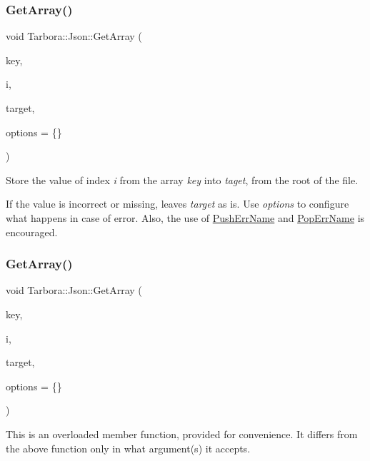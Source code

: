 \subsubsection{\texorpdfstring{Get\+Array()}{GetArray()}\hspace{0.1cm}{\footnotesize\ttfamily [1/12]}}
{\footnotesize\ttfamily void Tarbora\+::\+Json\+::\+Get\+Array (\begin{DoxyParamCaption}\item[{const char $\ast$}]{key,  }\item[{int}]{i,  }\item[{raw\+\_\+json $\ast$}]{target,  }\item[{\hyperlink{structTarbora_1_1JsonOptions}{Json\+Options}}]{options = {\ttfamily \{\}} }\end{DoxyParamCaption})}



Store the value of index {\itshape i} from the array {\itshape key} into {\itshape taget}, from the root of the file. 

If the value is incorrect or missing, leaves {\itshape target} as is. Use {\itshape options} to configure what happens in case of error. Also, the use of \hyperlink{classTarbora_1_1Json_a061eac4f16dac3b9b3a26a66de0ea8f0}{Push\+Err\+Name} and \hyperlink{classTarbora_1_1Json_a14019f06d3bd76edd6a6e78134519d11}{Pop\+Err\+Name} is encouraged. \mbox{\label{classTarbora_1_1Json_a8e4641817f1cff98894b789fd0f2ef70}} 
\subsubsection{\texorpdfstring{Get\+Array()}{GetArray()}\hspace{0.1cm}{\footnotesize\ttfamily [2/12]}}
{\footnotesize\ttfamily void Tarbora\+::\+Json\+::\+Get\+Array (\begin{DoxyParamCaption}\item[{const char $\ast$}]{key,  }\item[{int}]{i,  }\item[{bool $\ast$}]{target,  }\item[{\hyperlink{structTarbora_1_1JsonOptions}{Json\+Options}}]{options = {\ttfamily \{\}} }\end{DoxyParamCaption})}

This is an overloaded member function, provided for convenience. It differs from the above function only in what argument(s) it accepts. \mbox{\label{classTarbora_1_1Json_a707a924f561d6cdc8bf4ea1c78c8ed6b}} 
